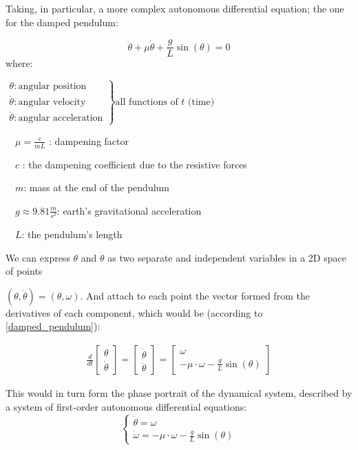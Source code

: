 Taking, in particular, a more complex autonomous differential equation; the one for the damped pendulum:

\begin{equation}\label{damped_pendulum}
  \ddot{\theta} +\mu\dot{\theta} + \frac{g}{L}\sin(\theta) = 0
\end{equation}
where:  \par
$
\left.
\begin{array}{l}
  \theta : \text{angular position}       \\
  \dot{\theta} : \text{angular velocity} \\
  \ddot{\theta} : \text{angular acceleration}
\end{array}
\right\}
\text{all functions of } t \text{ (time)}
$

\ \ $\mu = \frac{c}{mL}$ : dampening factor \par
\ \ $c$ : the dampening coefficient due to the resistive forces \par
\ \ $m$: mass at the end of the pendulum \par
\ \ $g \approx 9.81 \frac{m}{s^2}$: earth's gravitational acceleration \par
\ \ $L$: the pendulum's length \par

We can express $\theta$ and $\dot{\theta}$ as two separate and independent variables in a 2D space of points \par $(\theta,\dot{\theta}) = (\theta,\omega)$.
And attach to each point the vector formed from the derivatives of each component, which would be (according to \ref{damped_pendulum}):

\begin{align}
\frac{d}{dt}
\begin{bmatrix}
  \theta \\
  \dot{\theta}
\end{bmatrix} =
\begin{bmatrix}
  \dot{\theta} \\
  \ddot{\theta}
\end{bmatrix} =
\begin{bmatrix}
  \omega \\
  -\mu \cdot \omega - \frac{g}{L}\sin(\theta)
\end{bmatrix}
\end{align}

This would in turn form the phase portrait of the dynamical system, described by a system of first-order autonomous differential equations:
\[
\begin{cases}
  \dot{\theta}  = \omega \\
  \dot{\omega} = -\mu \cdot \omega - \frac{g}{L}\sin(\theta)
\end{cases}
\]

